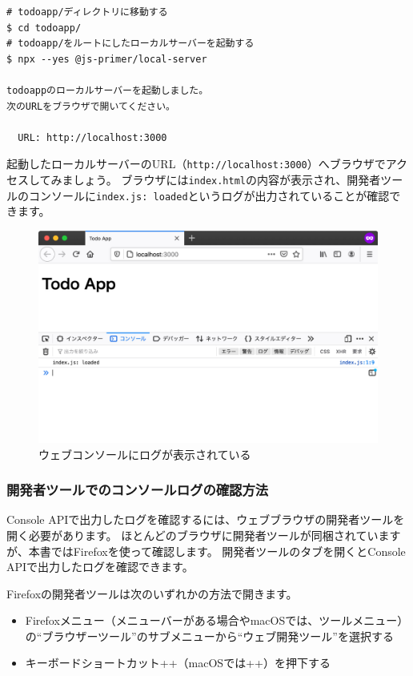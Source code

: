 \begin{lstlisting}
# todoapp/ディレクトリに移動する
$ cd todoapp/
# todoapp/をルートにしたローカルサーバーを起動する
$ npx --yes @js-primer/local-server

todoappのローカルサーバーを起動しました。
次のURLをブラウザで開いてください。

  URL: http://localhost:3000
\end{lstlisting}

起動したローカルサーバーのURL（\texttt{http://localhost:3000}）へブラウザでアクセスしてみましょう。
ブラウザには\texttt{index.html}の内容が表示され、開発者ツールのコンソールに\texttt{index.js: loaded}というログが出力されていることが確認できます。

\begin{figure}[h]
\centering
\includegraphics[width=130mm]{fig/first-entry.pdf}
\caption{ウェブコンソールにログが表示されている}
\end{figure}

\hypertarget{view-console-log-in-dev-tools}{%
\subsubsection{開発者ツールでのコンソールログの確認方法}\label{view-console-log-in-dev-tools}}

Console
APIで出力したログを確認するには、ウェブブラウザの開発者ツールを開く必要があります。
ほとんどのブラウザに開発者ツールが同梱されていますが、本書ではFirefoxを使って確認します。
開発者ツールの\textbf{}タブを開くとConsole
APIで出力したログを確認できます。

Firefoxの開発者ツールは次のいずれかの方法で開きます。

\begin{itemize}
\item
  Firefoxメニュー（メニューバーがある場合やmacOSでは、ツールメニュー）の``ブラウザーツール''のサブメニューから``ウェブ開発ツール''を選択する
\item
  キーボードショートカット++（macOSでは++）を押下する
\end{itemize}

